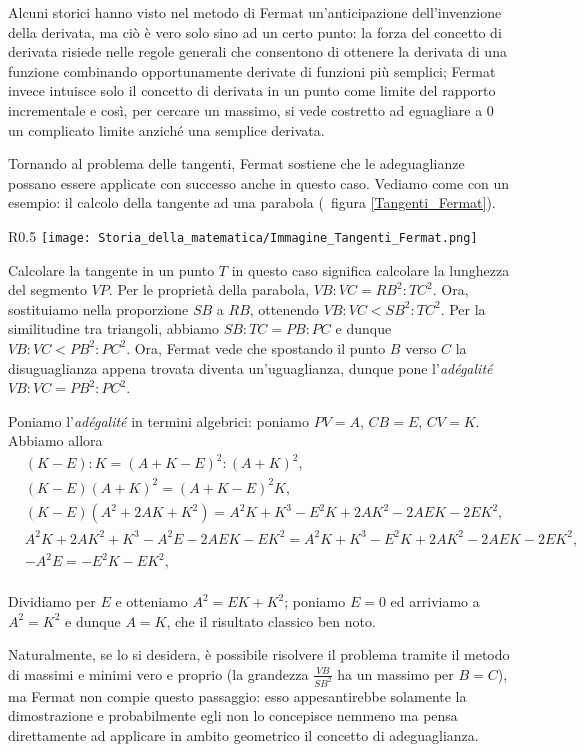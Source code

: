 \par Alcuni storici hanno visto nel metodo di Fermat un'anticipazione dell'invenzione della derivata, ma ci\`o \`e vero solo sino ad un certo punto: la forza del concetto di derivata risiede nelle regole generali che consentono di ottenere la derivata di una funzione combinando opportunamente derivate di funzioni pi\`u semplici; Fermat invece intuisce solo il concetto di derivata in un punto come limite del rapporto incrementale e cos\`i, per cercare un massimo, si vede costretto ad eguagliare a $0$ un complicato limite anzich\'e una semplice derivata.
\par Tornando al problema delle tangenti, Fermat sostiene che le adeguaglianze possano essere applicate con successo anche in questo caso. Vediamo come con un esempio: il calcolo della tangente ad una parabola (\Cfr\ figura \ref{Tangenti_Fermat}).
\begin{wrapfigure}{R}{0.5\textwidth}
	\texttt{[image: Storia\_della\_matematica/Immagine\_Tangenti\_Fermat.png]}
	\caption{Dimostrazione della propriet\`a classica della tangente ad una parabola secondo Fermat.}
	\label{Tangenti_Fermat}
\end{wrapfigure}
\par Calcolare la tangente in un punto $T$ in questo caso significa calcolare la lunghezza del segmento $VP$. Per le propriet\`a della parabola, $VB:VC=RB^2:TC^2$. Ora, sostituiamo nella proporzione $SB$ a $RB$, ottenendo $VB:VC < SB^2:TC^2$. Per la similitudine tra triangoli, abbiamo $SB:TC=PB:PC$ e dunque $VB:VC < PB^2:PC^2$. Ora, Fermat vede che spostando il punto $B$ verso $C$ la disuguaglianza appena trovata diventa un'uguaglianza, dunque pone l'\textit{ad\'egalit\'e} $VB:VC = PB^2:PC^2$.
\par Poniamo l'\textit{ad\'egalit\'e} in termini algebrici: poniamo $PV = A$, $CB = E$, $CV = K$. Abbiamo allora
\begin{align}
	&(K - E):K=(A + K - E)^2:(A + K)^2,\nonumber\\
	&(K - E)(A + K)^2=(A + K - E)^2 K,\nonumber\\
	&(K - E)(A^2 + 2AK + K^2)=A^2K + K^3 - E^2K + 2AK^2 - 2 AEK - 2EK^2,\nonumber\\
	&A^2K + 2AK^2 + K^3 - A^2E - 2AEK - EK^2=A^2K + K^3 - E^2K + 2AK^2 - 2 AEK - 2EK^2,\nonumber\\
	&- A^2E = - E^2K - EK^2,\nonumber\\
\end{align}
\par Dividiamo per $E$ e otteniamo $A^2 = EK + K^2$; poniamo $E = 0$ ed arriviamo a $A^2 = K^2$ e dunque $A = K$, che il risultato classico ben noto.
\par Naturalmente, se lo si desidera, \`e possibile risolvere il problema tramite il metodo di massimi e minimi vero e proprio (la grandezza $\frac{VB}{SB^2}$ ha un massimo per $B = C$), ma Fermat non compie questo passaggio: esso appesantirebbe solamente la dimostrazione e probabilmente egli non lo concepisce nemmeno ma pensa direttamente ad applicare in ambito geometrico il concetto di adeguaglianza.
